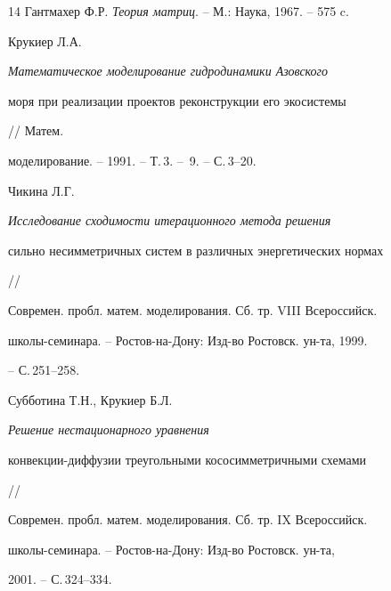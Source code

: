 \begin{thebibliography}{14}
Гантмахер Ф.Р. {\it Теория матриц}. -- М.: Наука, 1967. -- 575 c.




Крукиер Л.А. {\it Математическое моделирование гидродинамики Азовского 


моря при реализации проектов реконструкции его экосистемы} // Матем. 


моделирование. -- 1991. -- Т.\,3. -- \No\,9. -- С.\,3--20.




Чикина Л.Г. {\it Исследование сходимости итерационного метода решения 


сильно несимметричных систем в различных энергетических нормах} // 


Современ. пробл. матем. моделирования. Сб. тр. VIII Всероссийск.


школы-семинара. -- Ростов-на-Дону: Изд-во Ростовск. ун-та, 1999.


-- С.\,251--258.




Субботина Т.Н., Крукиер Б.Л. {\it Решение нестационарного уравнения 


конвекции-диффузии треугольными кососимметричными схемами} //


Современ. пробл. матем. моделирования. Сб. тр. IX Всероссийск.


школы-семинара. -- Ростов-на-Дону: Изд-во Ростовск. ун-та, 


2001. -- С.\,324--334.





\end{thebibliography}





\vskip 2cm












\label{end}





























